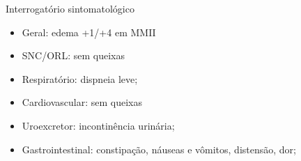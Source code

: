 \begin{frame}{Interrogatório sintomatológico}
\begin{itemize}
    \item Geral: edema +1/+4 em MMII
    \item SNC/ORL: sem queixas
    \item Respiratório: dispneia leve;
    \item Cardiovascular: sem queixas
    \item Uroexcretor: incontinência urinária;
    \item Gastrointestinal: constipação, náuseas e vômitos, distensão, dor;
\end{itemize}{}
\end{frame}